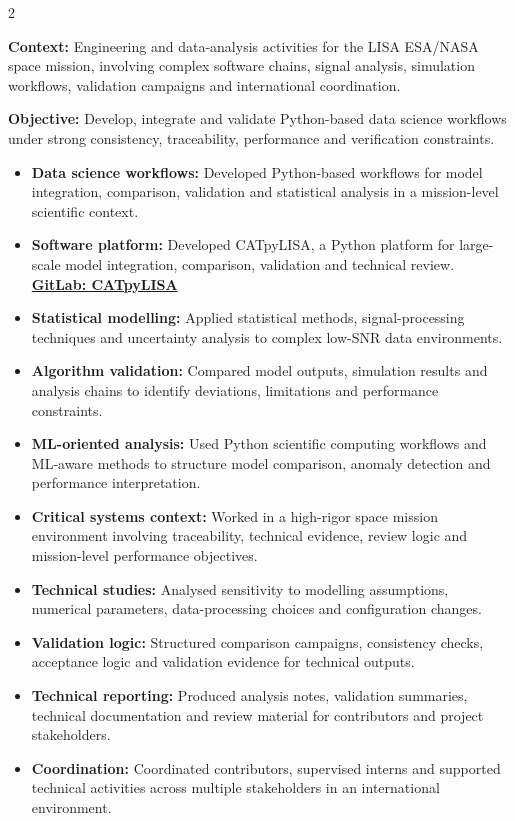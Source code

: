 \documentclass[8pt,a4paper,ragged2e,withhyper]{altacv}
\begin{document}
\begin{paracol}{2}
\divider


\textbf{Context:} Engineering and data-analysis activities for the LISA ESA/NASA space mission, involving complex software chains, signal analysis, simulation workflows, validation campaigns and international coordination.

\textbf{Objective:} Develop, integrate and validate Python-based data science workflows under strong consistency, traceability, performance and verification constraints.

\begin{itemize}
  \item \textbf{Data science workflows:} Developed Python-based workflows for model integration, comparison, validation and statistical analysis in a mission-level scientific context.
  \item \textbf{Software platform:} Developed CATpyLISA, a Python platform for large-scale model integration, comparison, validation and technical review.
  \textcolor{DarkPastelRed}{\href{https://gitlab.oca.eu/gboileau/lisa_l3_tools}{\bf GitLab: CATpyLISA}}
  \item \textbf{Statistical modelling:} Applied statistical methods, signal-processing techniques and uncertainty analysis to complex low-SNR data environments.
  \item \textbf{Algorithm validation:} Compared model outputs, simulation results and analysis chains to identify deviations, limitations and performance constraints.
  \item \textbf{ML-oriented analysis:} Used Python scientific computing workflows and ML-aware methods to structure model comparison, anomaly detection and performance interpretation.
  \item \textbf{Critical systems context:} Worked in a high-rigor space mission environment involving traceability, technical evidence, review logic and mission-level performance objectives.
  \item \textbf{Technical studies:} Analysed sensitivity to modelling assumptions, numerical parameters, data-processing choices and configuration changes.
  \item \textbf{Validation logic:} Structured comparison campaigns, consistency checks, acceptance logic and validation evidence for technical outputs.
  \item \textbf{Technical reporting:} Produced analysis notes, validation summaries, technical documentation and review material for contributors and project stakeholders.
  \item \textbf{Coordination:} Coordinated contributors, supervised interns and supported technical activities across multiple stakeholders in an international environment.
\end{itemize}


\end{paracol}
\end{document}
